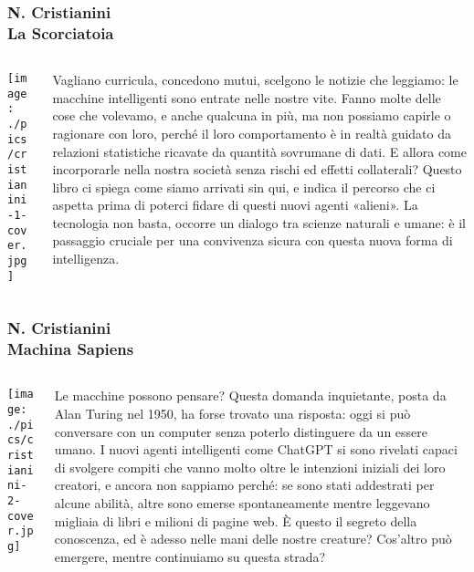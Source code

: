\documentclass[aspectratio=169]{beamer}
\begin{document}
%
%
\begin{frame}
\frametitle{\small N. Cristianini   \\ \normalsize \textbf{La Scorciatoia}}
\begin{columns}[c]
\begin{column}{0.35\textwidth}
    \centering
    \texttt{[image: ./pics/cristianini-1-cover.jpg]}
\end{column}
\begin{column}{0.6\textwidth}
    {\small
Vagliano curricula, concedono mutui, scelgono le notizie che leggiamo: le macchine intelligenti sono entrate nelle nostre vite. Fanno molte delle cose che volevamo, e anche qualcuna in più, ma non possiamo capirle o ragionare con loro, perché il loro comportamento è in realtà guidato da relazioni statistiche ricavate da quantità sovrumane di dati.  E allora come incorporarle nella nostra società senza rischi ed effetti collaterali? Questo libro ci spiega come siamo arrivati sin qui, e indica il percorso che ci aspetta prima di poterci fidare di questi nuovi agenti «alieni». La tecnologia non basta, occorre un dialogo tra scienze naturali e umane: è il passaggio cruciale per una convivenza sicura con questa nuova forma di intelligenza.
}
\end{column}
\end{columns}
\end{frame}
%
%
\begin{frame}
\frametitle{\small N. Cristianini   \\ \normalsize \textbf{Machina Sapiens}}
\begin{columns}[c]
\begin{column}{0.35\textwidth}
    \centering
    \texttt{[image: ./pics/cristianini-2-cover.jpg]}
\end{column}
\begin{column}{0.6\textwidth}
    {\small
Le macchine possono pensare? Questa domanda inquietante, posta da Alan Turing nel 1950, ha forse trovato una risposta: oggi si può conversare con un computer senza poterlo distinguere da un essere umano. I nuovi agenti intelligenti come ChatGPT si sono rivelati capaci di svolgere compiti che vanno molto oltre le intenzioni iniziali dei loro creatori, e ancora non sappiamo perché: se sono stati addestrati per alcune abilità, altre sono emerse spontaneamente mentre leggevano migliaia di libri e milioni di pagine web.
È questo il segreto della conoscenza, ed è adesso nelle mani delle nostre creature? Cos'altro può emergere, mentre continuiamo su questa strada?
}
\end{column}
\end{columns}
\end{frame}
\end{document}
